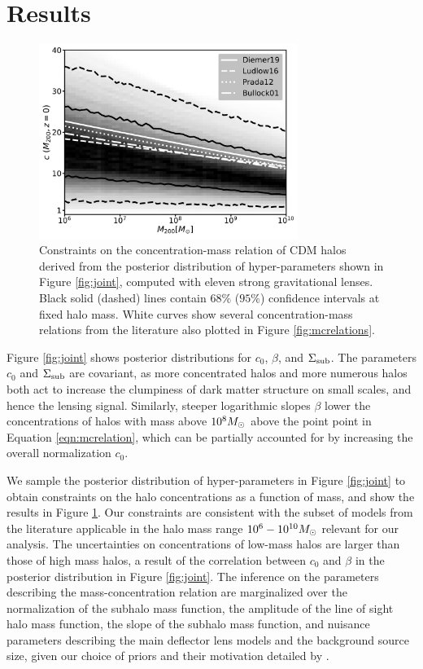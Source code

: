 \section{Results}
\label{sec:results}
\begin{figure}
	\centering
	\includegraphics[clip,trim=0cm 0cm 0cm
	0cm,width=0.75\textwidth,keepaspectratio]{./figures_mcrelation/mc_summary.pdf}
	\caption[Constraints on the concentration of halos as a function of halo mass]{\label{fig:mcphys} Constraints on the concentration-mass relation of CDM halos derived from the posterior distribution of hyper-parameters shown in Figure \ref{fig:joint}, computed with eleven strong gravitational lenses. Black solid (dashed) lines contain $68\%$ ($95\%$) confidence intervals at fixed halo mass. White curves show several concentration-mass relations from the literature also plotted in Figure \ref{fig:mcrelations}.}
\end{figure}	
Figure \ref{fig:joint} shows posterior distributions for $c_0$, $\beta$, and $\Sigma_{\rm{sub}}$. The parameters $c_0$ and $\Sigma_{\rm{sub}}$ are covariant, as more concentrated halos and more numerous halos both act to increase the clumpiness of dark matter structure on small scales, and hence the lensing signal. Similarly, steeper logarithmic slopes $\beta$ lower the concentrations of halos with mass above $10^8 {M_{\odot}}$ above the point point in Equation \ref{eqn:mcrelation}, which can be partially accounted for by increasing the overall normalization $c_0$.

We sample the posterior distribution of hyper-parameters in Figure \ref{fig:joint} to obtain constraints on the halo concentrations as a function of mass, and show the results in Figure \ref{fig:mcphys}. Our constraints are consistent with the subset of models from the literature applicable in the halo mass range $10^6 - 10^{10} {M_{\odot}}$ relevant for our analysis. The uncertainties on concentrations of low-mass halos are larger than those of high mass halos, a result of the correlation between $c_0$ and $\beta$ in the posterior distribution in Figure \ref{fig:joint}. The inference on the parameters describing the mass-concentration relation are marginalized over the normalization of the subhalo mass function, the amplitude of the line of sight halo mass function, the slope of the subhalo mass function, and nuisance parameters describing the main deflector lens models and the background source size, given our choice of priors and their motivation detailed by \cite{Gilman++19b}. 


